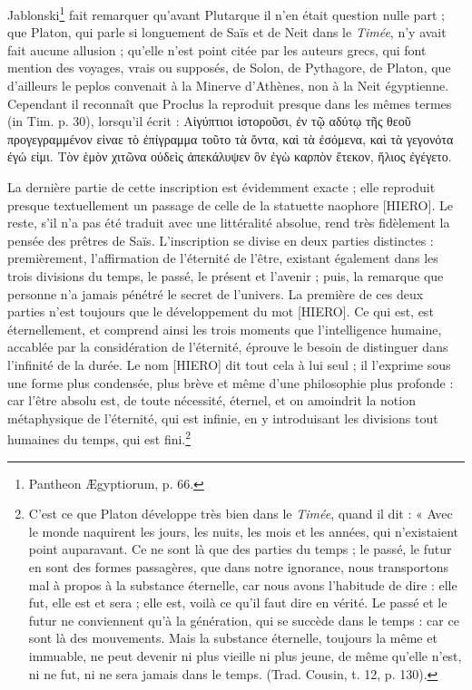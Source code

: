 \documentclass[a4paper, 11pt, oneside]{article}
\begin{document}
Jablonski\footnote{Pantheon Ægyptiorum, p. 66.} fait remarquer qu'avant Plutarque il n'en était question nulle part ; que Platon, qui parle si longuement de Saïs et de Neit dans le \emph{Timée}, n'y avait fait aucune allusion ; qu'elle n'est point citée par les auteurs grecs, qui font mention des voyages, vrais ou supposés, de Solon, de Pythagore, de Platon, que d'ailleurs le peplos convenait à la Minerve d'Athènes, non à la Neit égyptienne. Cependant il reconnaît que Proclus la reproduit presque dans les mêmes termes (in Tim. p. 30), lorsqu'il écrit : Αἰγύπτιοι ἱστοροῦσι, ἐν τῷ αδύτῳ τῆς θεοῦ προγεγραμμένον εἰναε τὸ ἐπίγραμμα τοῦτο τὰ ὄντα, καὶ τὰ ἐσόμενα, καὶ τὰ γεγονότα ἐγώ εἰμι. Τὸν ἑμὸν χιτῶνα οὐδεὶς ἀπεκάλυψεν ὃν ἐγὼ καρπὸν ἔτεκον, ἥλιος ἐγέγετο.

La dernière partie de cette inscription est évidemment exacte ; elle reproduit presque textuellement un passage de celle de la statuette naophore [HIERO]. Le reste, s'il n'a pas été traduit avec une littéralité absolue, rend très fidèlement la pensée des prêtres de Saïs. L'inscription se divise en deux parties distinctes : premièrement, l'affirmation de l'éternité de l'être, existant également dans les trois divisions du temps, le passé, le présent et l'avenir ; puis, la remarque que personne n'a jamais pénétré le secret de l'univers. La première de ces deux parties n'est toujours que le développement du mot [HIERO]. Ce qui est, est éternellement, et comprend ainsi les trois moments que l'intelligence humaine, accablée par la considération de l'éternité, éprouve le besoin de distinguer dans l'infinité de la durée. Le nom [HIERO] dit tout cela à lui seul ; il l'exprime sous une forme plus condensée, plus brève et même d'une philosophie plus profonde : car l'être absolu est, de toute nécessité, éternel, et on amoindrit la notion métaphysique de l'éternité, qui est infinie, en y introduisant les divisions tout humaines du temps, qui est fini.\footnote{C'est ce que Platon développe très bien dans le \emph{Timée}, quand il dit : « Avec le monde naquirent les jours, les nuits, les mois et les années, qui n'existaient point auparavant. Ce ne sont là que des parties du temps ; le passé, le futur en sont des formes passagères, que dans notre ignorance, nous transportons mal à propos à la substance éternelle, car nous avons l'habitude de dire : elle fut, elle est et sera ; elle est, voilà ce qu'il faut dire en vérité. Le passé et le futur ne conviennent qu'à la génération, qui se succède dans le temps : car ce sont là des mouvements. Mais la substance éternelle, toujours la même et immuable, ne peut devenir ni plus vieille ni plus jeune, de même qu'elle n'est, ni ne fut, ni ne sera jamais dans le temps. (Trad. Cousin, t. 12, p. 130).}
\end{document}
